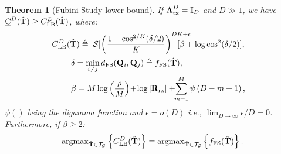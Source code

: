 \documentclass[journal,comsoc]{IEEEtran}
\newtheorem{theorem}{Theorem}[section]
\begin{document}
%
\begin{theorem}[Fubini-Study lower bound] \label{Th_grassmann_tighter}
If $\boldsymbol{\Lambda}^D_{\rm tx} = \mathbb{I}_D$ and $D \gg 1$, we have $\underbar{C}^{D}(\hat{\mathbf{T}}) \geq C^{D}_{\rm LB}(\hat{\mathbf{T}})$, where:
\begin{subequations}
\begin{flalign}
& C^{D}_{\rm LB}(\hat{\mathbf{T}}) \triangleq |\mathcal{S}| {\left( \frac{1-\cos^{2/K}(\delta/2)}{K} \right)}^{D K + \epsilon} \!\!\!\!\!\!\!\!\!\![\beta + \log \cos^2(\delta/2)], \label{eqn_grassmann_tighter1} & \\
& \qquad \ \delta = \min_{i \neq j} d_{\rm FS}(\mathbf{Q}_i,\mathbf{Q}_j) \triangleq f_{\rm FS}(\hat{\mathbf{T}}), & \\
& \qquad \ \beta = M \log \left(\frac{\rho}{M} \right) \!+\! \log\left| \mathbf{R}_{\rm rx} \right| + \!\! \sum_{m=1}^M \psi\left(D-m+1\right), \!\!\!\!\label{eqn_def_beta} &
\end{flalign}
\end{subequations}
$\psi()$ being the digamma function and $\epsilon = o(D)$ i.e., $\lim_{D \rightarrow \infty} \epsilon/D = 0$. Furthermore, if $\beta \geq 2$:
\begin{eqnarray}
{\rm argmax}_{\hat{\mathbf{T}} \in \mathcal{T}_{\mathcal{G}}} \left \{ C^{D}_{\rm LB}(\hat{\mathbf{T}}) \right \} \equiv {\rm argmax}_{\hat{\mathbf{T}} \in \mathcal{T}_{\mathcal{G}}} \left \{ f_{\rm FS}(\hat{\mathbf{T}}) \right \}. \label{eqn_grassmann_tighter2}
\end{eqnarray}
\end{theorem}
\end{document}
